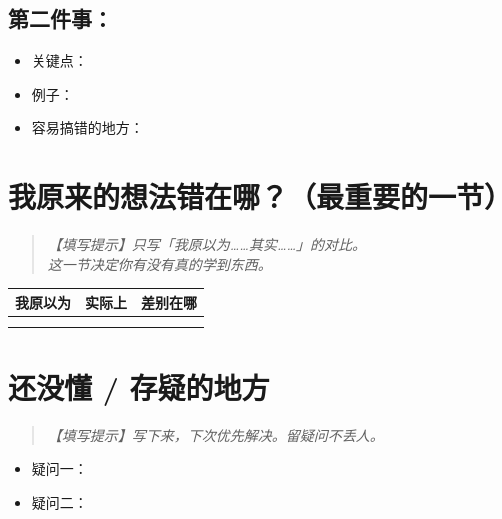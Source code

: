 \subsection{第二件事：}

\begin{itemize}[leftmargin=*, itemsep=0.3em]
  \item 关键点：
  \item 例子：
  \item 容易搞错的地方：
\end{itemize}


\section{我原来的想法错在哪？（最重要的一节）}

\begin{quote}
\itshape
【填写提示】只写「我原以为……其实……」的对比。\\
这一节决定你有没有真的学到东西。
\end{quote}

\begin{center}
\begin{tabular}{p{} p{} p{}}
\toprule
\textbf{我原以为} & \textbf{实际上} & \textbf{差别在哪} \\
\midrule
                &                &              \\
\addlinespace
                &                &              \\
\bottomrule
\end{tabular}
\end{center}


\section{还没懂 / 存疑的地方}

\begin{quote}
\itshape
【填写提示】写下来，下次优先解决。留疑问不丢人。
\end{quote}

\begin{itemize}[leftmargin=*, label=$\square$, itemsep=0.3em]
  \item 疑问一：
  \item 疑问二：
\end{itemize}


